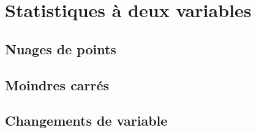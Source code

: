 
\chapter{Statistiques à deux variables}

\section{Nuages de points}


\section{Moindres carrés}



\section{Changements de variable}




